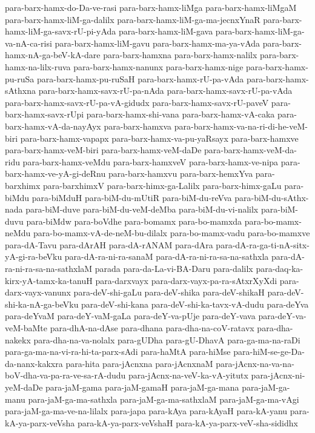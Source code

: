 {para-barx-hamx-do-Da-ve-rasi
para-barx-hamx-liMga
para-barx-hamx-liMgaM
para-barx-hamx-liM-ga-dalilx
para-barx-hamx-liM-ga-ma-jecnxYnaR
para-barx-hamx-liM-ga-savx-rU-pi-yAda
para-barx-hamx-liM-gava
para-barx-hamx-liM-ga-va-nA-ca-risi
para-barx-hamx-liM-gavu
para-barx-hamx-ma-ya-vAda
para-barx-hamx-nA-ga-beV-kA-dare
para-barx-hamxna
para-barx-hamx-nalilx
para-barx-hamx-na-lilx-ruva
para-barx-hamx-nanunx
para-barx-hamx-nige
para-barx-hamx-pu-ruSa
para-barx-hamx-pu-ruSaH
para-barx-hamx-rU-pa-vAda
para-barx-hamx-sAthxna
para-barx-hamx-savx-rU-pa-nAda
para-barx-hamx-savx-rU-pa-vAda
para-barx-hamx-savx-rU-pa-vA-gidudx
para-barx-hamx-savx-rU-paveV
para-barx-hamx-savx-rUpi
para-barx-hamx-shi-vana
para-barx-hamx-vA-caka
para-barx-hamx-vA-da-nayAyx
para-barx-hamxva
para-barx-hamx-va-na-ri-di-he-veM-biri
para-barx-hamx-vapapx
para-barx-hamx-va-pu-yaRsayx
para-barx-hamxve
para-barx-hamx-veM-biri
para-barx-hamx-veM-daDe
para-barx-hamx-veM-da-ridu
para-barx-hamx-veMdu
para-barx-hamxveV
para-barx-hamx-ve-nipa
para-barx-hamx-ve-yA-gi-deRnu
para-barx-hamxvu
para-barx-hemxYva
para-barxhimx
para-barxhimxV
para-barx-himx-ga-Lalilx
para-barx-himx-gaLu
para-biMdu
para-biMduH
para-biM-du-mUtiR
para-biM-du-reVva
para-biM-du-sAthx-nada
para-biM-duve
para-biM-du-veM-deMba
para-biM-du-vi-nalilx
para-biM-duvu
para-biMdw
para-boVdhe
para-bomamx
para-bo-mamxda
para-bo-mamx-neMdu
para-bo-mamx-vA-de-neM-bu-dilalx
para-bo-mamx-vadu
para-bo-mamxve
para-dA-Tavu
para-dArAH
para-dA-rANAM
para-dAra
para-dA-ra-ga-ti-nA-sitx-yA-gi-ra-beVku
para-dA-ra-ni-ra-sanaM
para-dA-ra-ni-ra-sa-na-sathxla
para-dA-ra-ni-ra-sa-na-sathxlaM
parada
para-da-La-vi-BA-Daru
para-dalilx
para-daq-ka-kirx-yA-tamx-ka-tanuH
para-darxvayx
para-darx-vayx-pa-ra-sAtxrXyXdi
para-darx-vayx-vanunx
para-deV-shi-gaLu
para-deV-shika
para-deV-shikaH
para-deV-shi-ka-nA-ga-beVku
para-deV-shi-kana
para-deV-shi-ka-tavx-vA-dudu
para-deYva
para-deYvaM
para-deY-vaM-gaLa
para-deY-va-pUje
para-deY-vava
para-deY-va-veM-baMte
para-dhA-na-dAse
para-dhana
para-dha-na-coV-ratavx
para-dha-nakekx
para-dha-na-va-nolalx
para-gUDha
para-gU-DhavA
para-ga-ma-na-raDi
para-ga-ma-na-vi-ra-hi-ta-parx-sAdi
para-haMtA
para-hiMse
para-hiM-se-ge-Da-da-nanx-kakxra
para-hita
para-jAcnxna
para-jAcnxnaM
para-jAcnx-na-va-na-boV-dha-va-pa-ra-ve-sa-rA-dudu
para-jAcnx-na-veV-ka-vA-yitutx
para-jAcnx-ni-yeM-daDe
para-jaM-gama
para-jaM-gamaH
para-jaM-ga-mana
para-jaM-ga-manu
para-jaM-ga-ma-sathxla
para-jaM-ga-ma-sathxlaM
para-jaM-ga-ma-vAgi
para-jaM-ga-ma-ve-na-lilalx
para-japa
para-kAya
para-kAyaH
para-kA-yanu
para-kA-ya-parx-veVsha
para-kA-ya-parx-veVshaH
para-kA-ya-parx-veV-sha-sididhx
}
